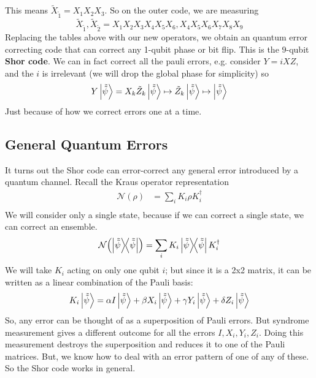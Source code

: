 This means $\tilde{X}_{\tilde{1}} = X_1 X_2 X_3$.
So on the outer code, we are measuring
\[ \tilde{X}_{\tilde{1}}, \tilde{X}_{\tilde{2}} = X_1 X_2 X_3 X_4 X_5 X_6, X_4 X_5 X_6 X_7 X_8 X_9 \]
Replacing the tables above with our new operators, we obtain an quantum error correcting code that
can correct any 1-qubit phase or bit flip. This is the $9$-qubit \textbf{Shor code}. 
We can in fact correct
all the pauli errors, e.g. consider $Y = i XZ$, and the $i$ is irrelevant (we will drop the global phase for simplicity) so \[ Y \ket{\tilde{\tilde{\psi}}} = X_k \tilde{Z}_k \ket{\tilde{\tilde{\psi}}} \mapsto \tilde{Z}_k \ket{\tilde{\tilde{\psi}}} \mapsto \ket{\tilde{\tilde{\psi}}}\]
Just because of how we correct errors one at a time.

\subsection{General Quantum Errors}
It turns out the Shor code can error-correct any general error introduced by a quantum channel.
Recall the Kraus operator representation
\begin{align*}
    \mathcal{N}(\rho) &= \sum_i K_i \rho K_i^{\dagger} \\
\end{align*}
We will consider only a single state, because if we can correct a single state, we can correct an ensemble.
\[ \mathcal{N}\qty(\ketbra{\tilde{\tilde{\psi}}}) = \sum_i K_i \ketbra{\tilde{\tilde{\psi}}} K_i^{\dagger} \]
We will take $K_i$ acting on only one qubit $i$; but since it is a 2x2 matrix, it can be written
as a linear combination of the Pauli basis:
\[ K_i \ket{\tilde{\tilde{\psi}}} = \alpha I \ket{\tilde{\tilde{\psi}}} + \beta X_i \ket{\tilde{\tilde{\psi}}} + \gamma Y_i \ket{\tilde{\tilde{\psi}}} + \delta Z_i \ket{\tilde{\tilde{\psi}}} \]
So, any error can be thought of as a superposition of Pauli errors.
But syndrome measurement gives a different outcome for all the errors $I, X_i, Y_i, Z_i$.
Doing this measurement destroys the superposition and reduces it to one of the Pauli matrices. But, we know how to deal with an error pattern of one of any of these.
So the Shor code works in general.
